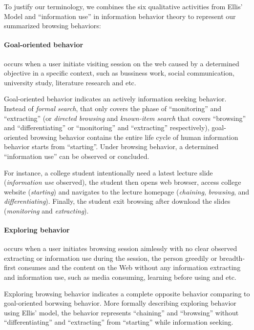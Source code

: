 To justify our terminology, we combines the six qualitative activities from Ellis' Model 
\cite{ellis1989behavioural} and ``information use'' in information behavior theory 
to represent our summarized browsing behaviors:

\paragraph{Goal-oriented behavior} occurs when a user initiate 
visiting session on the web caused by a determined objective in a specific context, 
such as bussiness work, 
social communication, university study, literature research and etc. 

Goal-oriented behavior indicates an actively information seeking behavior.
Instead of \emph{formal search}, that only covers the phase of ``monitoring'' and ``extracting''
(or \emph{directed browsing} and \emph{known-item search} that covers ``browsing'' and ``differentiating'' or 
``monitoring'' and ``extracting'' respectively), 
goal-oriented browsing behavior contains the entire life cycle of human information behavior starts
from ``starting''. Under browsing behavior, a determined ``information use'' can be observed
or concluded.

For instance, a college student intentionally need a latest lecture slide (\emph{information use} observed), 
the student then opens web browser, access college website (\emph{starting}) and navigates to the lecture homepage 
(\emph{chaining}, \emph{browsing}, and \emph{differentiating}).
Finally, the student exit browsing after download the slides (\emph{monitoring} and \emph{extracting}).

\paragraph{Exploring behavior} occurs when a user initiates browsing session aimlessly with no clear observed
extracting or information use during the session, the person greedily or breadth-first consumes and the content on the Web without 
any information extracting and information use, such as media consuming, learning before using and etc.

Exploring browsing behavior indicates a complete opposite behavior comparing to 
goal-oriented borwsing behavior. More formally describing exploring behavior using Ellis' model, 
the behavior represents ``chaining'' and ``browsing''
without ``differentiating'' and ``extracting'' from ``starting'' while information seeking.

